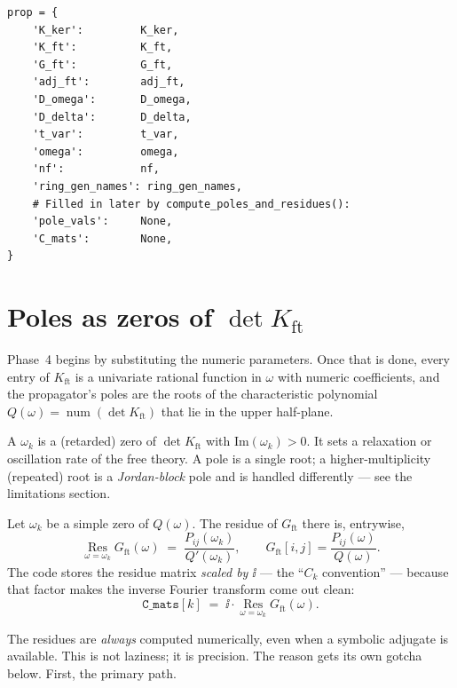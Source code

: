 \begin{lstlisting}
prop = {
    'K_ker':         K_ker,
    'K_ft':          K_ft,
    'G_ft':          G_ft,
    'adj_ft':        adj_ft,
    'D_omega':       D_omega,
    'D_delta':       D_delta,
    't_var':         t_var,
    'omega':         omega,
    'nf':            nf,
    'ring_gen_names': ring_gen_names,
    # Filled in later by compute_poles_and_residues():
    'pole_vals':     None,
    'C_mats':        None,
}
\end{lstlisting}

\section{Poles as zeros of \texorpdfstring{$\det K_{\mathrm{ft}}$}{det K}}

Phase~4 begins by substituting the numeric parameters. Once that is done, every
entry of $K_{\mathrm{ft}}$ is a univariate rational function in $\omega$ with
numeric coefficients, and the propagator's poles are the roots of the
characteristic polynomial $Q(\omega) = \operatorname{num}(\det K_{\mathrm{ft}})$
that lie in the upper half-plane.

\begin{defn}
A  $\omega_k$ is a (retarded) zero of $\det K_{\mathrm{ft}}$ with
$\mathrm{Im}(\omega_k) > 0$. It sets a relaxation or oscillation rate of the free
theory. A  pole is a single root; a higher-multiplicity (repeated)
root is a \emph{Jordan-block} pole and is handled differently --- see the
limitations section.
\end{defn}

Let $\omega_k$ be a simple zero of $Q(\omega)$. The residue of $G_{\mathrm{ft}}$
there is, entrywise,
\begin{equation}
  \operatorname*{Res}_{\omega=\omega_k} G_{\mathrm{ft}}(\omega)
  \;=\; \frac{P_{ij}(\omega_k)}{Q'(\omega_k)},
  \qquad
  G_{\mathrm{ft}}[i,j] = \frac{P_{ij}(\omega)}{Q(\omega)}.
  \label{eq:residue}
\end{equation}
The code stores the residue matrix \emph{scaled by $\ii$} --- the ``$C_k$
convention'' --- because that factor makes the inverse Fourier transform come out
clean:
\begin{equation}
  \texttt{C\_mats}[k] \;=\; \ii\cdot
  \operatorname*{Res}_{\omega=\omega_k} G_{\mathrm{ft}}(\omega).
  \label{eq:Ck}
\end{equation}

The residues are \emph{always} computed numerically, even when a symbolic
adjugate is available. This is not laziness; it is precision. The reason gets its
own gotcha below. First, the primary path.

